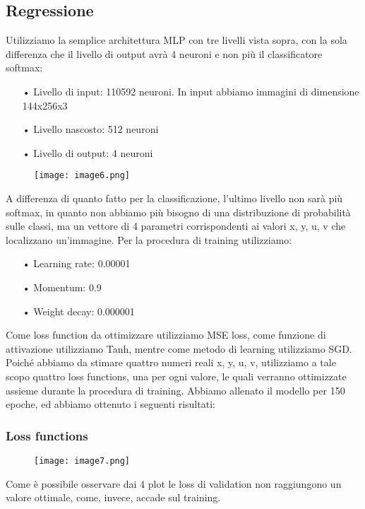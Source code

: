 \subsection{Regressione}
Utilizziamo la semplice architettura MLP con tre livelli vista sopra, con la sola differenza che il livello di output avrà 4 neuroni e non più il classificatore softmax:
\begin{itemize}
	\item[•]Livello di input: 110592 neuroni. In input abbiamo immagini di dimensione 144x256x3
	\item[•]Livello nascosto: 512 neuroni
	\item[•]Livello di output: 4 neuroni
\end{itemize}
\begin{figure}[H]
	\centering
	\texttt{[image: image6.png]}
\end{figure}
A differenza di quanto fatto per la classificazione, l’ultimo livello non sarà più softmax, in quanto non abbiamo più bisogno di una distribuzione di probabilità sulle classi, ma un vettore di 4 parametri corrispondenti ai valori x, y, u, v che localizzano un’immagine.
Per la procedura di training utilizziamo: 
\begin{itemize}
	\item[•]Learning rate: 0.00001
	\item[•]Momentum: 0.9
	\item[•]Weight decay: 0.000001
\end{itemize}
Come loss function da ottimizzare utilizziamo MSE loss, come funzione di attivazione utilizziamo Tanh, mentre come metodo di learning utilizziamo SGD.
\newline
Poiché abbiamo da stimare quattro numeri reali x, y, u, v, utilizziamo a tale scopo quattro loss functions, una per ogni valore, le quali verranno ottimizzate assieme durante la procedura di training.
\newline
Abbiamo allenato il modello per 150 epoche, ed abbiamo ottenuto i seguenti risultati:

\subsubsection{Loss functions}
\begin{figure}[H]
	\centering
	\texttt{[image: image7.png]}
\end{figure}
Come è possibile osservare dai 4 plot le loss di validation non raggiungono un valore ottimale, come, invece, accade sul training.

